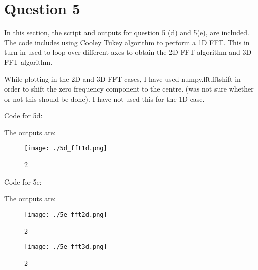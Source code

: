\section{Question 5}

In this section, the script and outputs for question 5 (d) and 5(e), are included.
The code includes using Cooley Tukey algorithm to perform a 1D FFT. This in turn in used to loop over different axes to obtain the 2D FFT algorithm and 3D FFT algorithm. 

While plotting in the 2D and 3D FFT cases, I have used numpy.fft.fftshift in order to shift the zero frequency component to the centre. (was not sure whether or not this should be done). I have not used this for the 1D case.

Code for 5d:


The outputs are:


\begin{figure}[H]
  \centering
  \texttt{[image: ./5d\_fft1d.png]}
  \caption{2}
  \label{fig:fig1}
\end{figure}


Code for 5e:


The outputs are:


\begin{figure}[H]
  \centering
  \texttt{[image: ./5e\_fft2d.png]}
  \caption{2}
  \label{fig:fig1}
\end{figure}

\begin{figure}[H]
  \centering
  \texttt{[image: ./5e\_fft3d.png]}
  \caption{2}
  \label{fig:fig1}
\end{figure}

